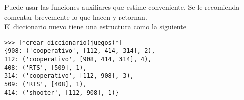 Puede usar las funciones auxiliares que estime conveniente. Se le recomienda comentar brevemente lo que hacen y retornan.
\\
El diccionario nuevo tiene una estructura como la siguiente

\begin{lstlisting}[style=consola]
>>> [*crear_diccionario(juegos)*]
{908: ('cooperativo', [112, 414, 314], 2), 
112: ('cooperativo', [908, 414, 314], 4), 
408: ('RTS', [509], 1), 
314: ('cooperativo', [112, 908], 3), 
509: ('RTS', [408], 1), 
414: ('shooter', [112, 908], 1)}
\end{lstlisting}